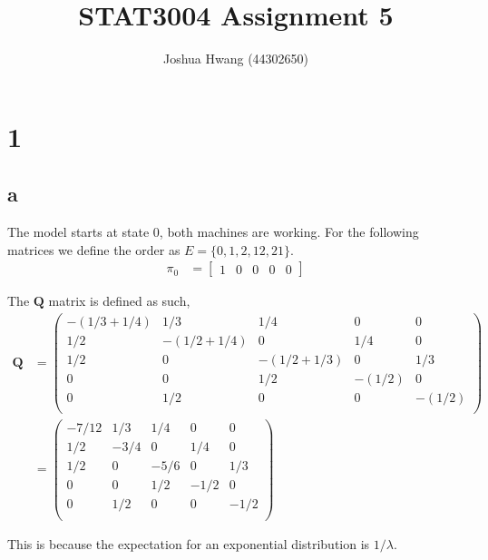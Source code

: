 \documentclass{article}
\title{STAT3004 Assignment 5}
\author{Joshua Hwang (44302650)}
\begin{document}
\maketitle
\section{1}
\subsection{a}
The model starts at state 0, both machines are working.
For the following matrices we define the order as
$E = \{0,1,2,12,21\}$.
\begin{align*}
    \pi_0
    &=
    \begin{bmatrix}
        1 & 0 & 0 & 0 & 0
    \end{bmatrix}
\end{align*}

The $\bm{Q}$ matrix is defined as such,
\begin{align*}
    \bm{Q}
    &=
    \begin{pmatrix}
        -(1/3 + 1/4) & 1/3          & 1/4          & 0      & 0 \\
        1/2          & -(1/2 + 1/4) & 0            & 1/4    & 0 \\
        1/2          & 0            & -(1/2 + 1/3) & 0      & 1/3 \\
        0            & 0            & 1/2          & -(1/2) & 0 \\
        0            & 1/2          & 0            & 0      & -(1/2) \\
    \end{pmatrix} \\
    &=
    \begin{pmatrix}
        -7/12        & 1/3          & 1/4          & 0      & 0 \\
        1/2          & -3/4         & 0            & 1/4    & 0 \\
        1/2          & 0            & -5/6         & 0      & 1/3 \\
        0            & 0            & 1/2          & -1/2   & 0 \\
        0            & 1/2          & 0            & 0      & -1/2 \\
    \end{pmatrix}
\end{align*}

This is because the expectation for an exponential distribution is $1/\lambda$.
\end{document}
